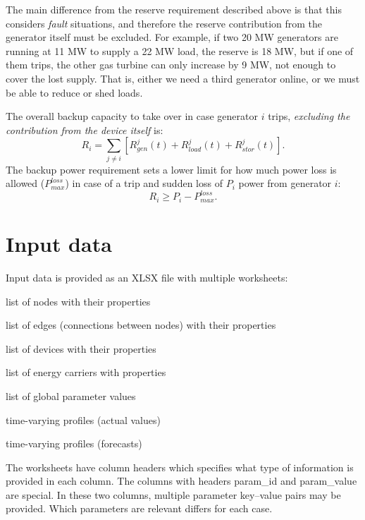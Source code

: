 \documentclass[12pt]{article}
\begin{document}
The main difference from the reserve requirement described above is that this considers \emph{fault} situations, and therefore the reserve contribution from the generator itself must be excluded. For example, if two 20 MW generators are running at 11 MW to supply a 22 MW load, the reserve is 18 MW, but if one of them trips, the other gas turbine can only increase by 9 MW, not enough to cover the lost supply. That is, either we need a third generator online, or we must be able to reduce or shed loads.


The overall backup capacity to take over in case generator $i$ trips, \emph{excluding the contribution from the device itself}  is:
\begin{equation}
 	R_{i}=  \sum _{j \neq i}^{} \left[ R_{gen}^j(t) +R_{load}^j(t) +R_{stor}^j(t) \right] . 
\end{equation}
The backup power requirement sets a lower limit for how much power loss is allowed ($P^{loss}_{max}$) in case of a trip and sudden loss of $P_i$ power from generator $i$: 
 \begin{equation}
 	R_{i}   \geq P_i - P^{loss}_{max}.
 \end{equation}



\section{Input data}
Input data is provided as an XLSX file with multiple worksheets:

\begin{description}[labelindent=\parindent,topsep=6pt]
\item[node] list of nodes with their properties
\item[edge] list of edges (connections between nodes) with their properties
\item[device] list of devices with their properties
\item[carriers] list of energy carriers with properties
\item[parameters] list of global parameter values
\item[profiles] time-varying profiles (actual values)
\item[profiles\_forecast] time-varying profiles (forecasts)
\end{description}

The worksheets have column headers which specifies what type of information is provided in each column. The columns with headers param\_id and param\_value are special. In these two columns, multiple parameter key--value pairs may be provided. Which parameters are relevant differs for each case.
\end{document}
